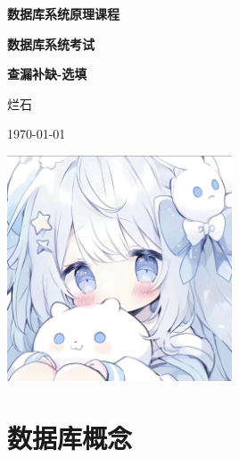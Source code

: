 \documentclass[a4paper,12pt,UTF8,fontset=none]{ctexart}
\begin{document}
\begin{titlepage}
    \centering
    \vspace*{\fill}
    {\Large\bfseries 数据库系统原理课程\par}
    \vspace{2cm}
    {\LARGE\bfseries 数据库系统考试\par}
    \vspace{2cm}
    {\Large\bfseries 查漏补缺-选填\par}
    \vspace{2cm}
    {\Large 烂石\par}
    \vspace{1cm}
    {\large \today \par}
    \vspace{4cm}
    \includegraphics[width=0.5\textwidth]{static/images/logo.jpg}
    \vspace*{\fill}
    \thispagestyle{empty} %
    \newpage
\end{titlepage}
\section{数据库概念}
\end{document}
